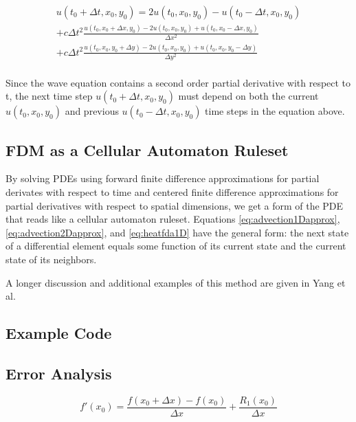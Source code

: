 {   \begin{multline}\label{eq:wavefda2d}
u(t_{0} + \Delta  t,x_{0},y_{0})  = 2u(t_{0},x_{0},y_{0})-u(t_{0} -\Delta  t,x_{0},y_{0})\\
+c\Delta  t^{2}\frac{u(t_{0},x_{0} + \Delta  x,y_{0})- 2u(t_{0},x_{0},y_{0}) + u(t_{0},x_{0} -\Delta  x,y_{0})}{\Delta  x^{2}}\\
+c\Delta  t^{2}\frac{u(t_{0},x_{0},y_{0}+ \Delta  y)- 2u(t_{0},x_{0},y_{0}) + u(t_{0},x_{0},y_{0} -\Delta  y)}{\Delta  y^{2}}
  \end{multline}
\\
Since the wave equation contains a second order partial derivative with respect to t, the next time step $u(t_{0} + \Delta  t,x_{0},y_{0})$ must depend on both the current $u(t_{0},x_{0},y_{0})$ and previous $u(t_{0}-\Delta t,x_{0},y_{0})$ time steps in the equation above.

\subsection{FDM as a Cellular Automaton Ruleset}

By solving PDEs using forward finite difference approximations for partial derivates with respect to time and centered finite difference approximations for partial derivatives with respect to spatial dimensions, we get a form of the PDE that reads like a cellular automaton ruleset.  Equations \ref{eq:advection1Dapprox}, \ref{eq:advection2Dapprox}, and \ref{eq:heatfda1D} have the general form: the next state of a differential element equals some function of its current state and the current state of its neighbors.

A longer discussion and additional examples of this method are given in Yang et al\cite{Yang2010}.

\subsection{Example Code}

\subsection{Error Analysis}\label{sec:errorAnalysis}

 \begin{equation}
 f'(x_{0}) = \frac{f(x_{0} + \Delta  x) - f(x_{0})}{\Delta  x} + \frac{R_{1}(x_{0})}{\Delta  x}
  \end{equation}
  
}
